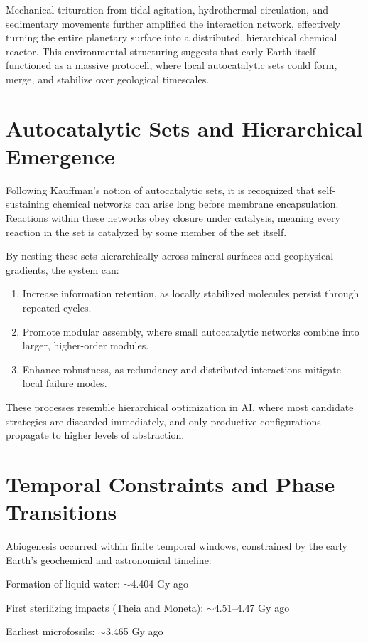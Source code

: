 \documentclass{book}
\begin{document}
Mechanical trituration from tidal agitation, hydrothermal circulation, and sedimentary movements further amplified the interaction network, effectively turning the entire planetary surface into a distributed, hierarchical chemical reactor. This environmental structuring suggests that early Earth itself functioned as a massive protocell, where local autocatalytic sets could form, merge, and stabilize over geological timescales.

\section{Autocatalytic Sets and Hierarchical Emergence}
Following Kauffman’s notion of autocatalytic sets, it is recognized that self-sustaining chemical networks can arise long before membrane encapsulation. Reactions within these networks obey closure under catalysis, meaning every reaction in the set is catalyzed by some member of the set itself.

By nesting these sets hierarchically across mineral surfaces and geophysical gradients, the system can:

\begin{enumerate}
\item Increase information retention, as locally stabilized molecules persist through repeated cycles.
\item Promote modular assembly, where small autocatalytic networks combine into larger, higher-order modules.
\item Enhance robustness, as redundancy and distributed interactions mitigate local failure modes.
\end{enumerate}

These processes resemble hierarchical optimization in AI, where most candidate strategies are discarded immediately, and only productive configurations propagate to higher levels of abstraction.

\section{Temporal Constraints and Phase Transitions}
Abiogenesis occurred within finite temporal windows, constrained by the early Earth’s geochemical and astronomical timeline:

Formation of liquid water: $\sim$4.404 Gy ago

First sterilizing impacts (Theia and Moneta): $\sim$4.51–4.47 Gy ago

Earliest microfossils: $\sim$3.465 Gy ago
\end{document}
